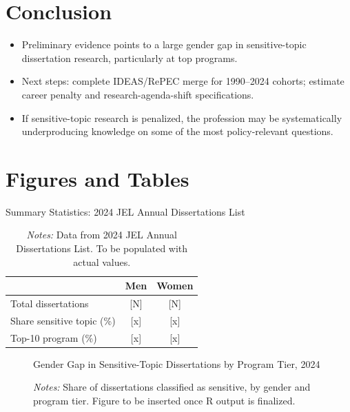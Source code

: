 \documentclass[12pt,a4paper]{article}
\begin{document}
\section{Conclusion}
\label{sec:conclusion}
\begin{itemize}
    \item Preliminary evidence points to a large gender gap in sensitive-topic dissertation research, particularly at top programs.
    \item Next steps: complete IDEAS/RePEC merge for 1990--2024 cohorts; estimate career penalty and research-agenda-shift specifications.
    \item If sensitive-topic research is penalized, the profession may be systematically underproducing knowledge on some of the most policy-relevant questions.
\end{itemize}

\vfill
\pagebreak{}
\cleardoublepage
\begin{spacing}{1.0}


\end{spacing}
\cleardoublepage


\section*{Figures and Tables}
\label{sec:figures-tables}

\begin{table}[h!]
\centering
\caption{Summary Statistics: 2024 JEL Annual Dissertations List}
\label{tab:summary}
\begin{tabular}{lcc}
\toprule
 & Men & Women \\
\midrule
Total dissertations & [N] & [N] \\
Share sensitive topic (\%) & [x] & [x] \\
Top-10 program (\%) & [x] & [x] \\
\bottomrule
\end{tabular}
\caption*{\textit{Notes:} Data from 2024 JEL Annual Dissertations List. To be populated with actual values.}
\end{table}

\newpage
\begin{figure}[h!]
\centering
\caption{Gender Gap in Sensitive-Topic Dissertations by Program Tier, 2024}
\label{fig:gender_gap}
\caption*{\textit{Notes:} Share of dissertations classified as sensitive, by gender and program tier. Figure to be inserted once R output is finalized.}
\end{figure}
\end{document}
